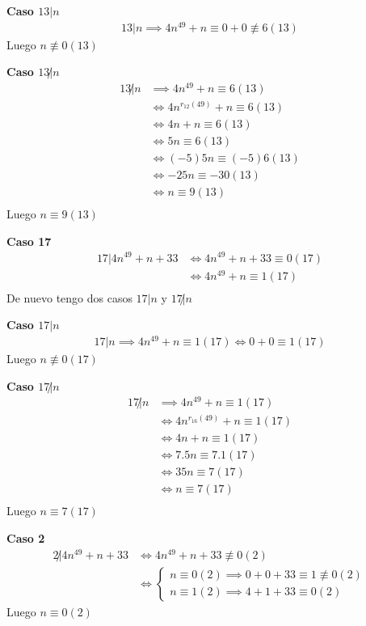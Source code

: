 \textbf{Caso $13|n$ }
\begin{align*}
    13 | n \implies 4n^{49} + n \equiv 0 + 0 \not \equiv 6 (13)
\end{align*}
Luego $ n \not \equiv 0(13) $

\textbf{Caso $13\not |n$ }
\begin{align*}
    13 \not | n &\implies 4n^{49} + n \equiv 6 (13) \\
    &\iff 4n^{r_{12}(49)} + n \equiv 6 (13) \\
    &\iff 4n + n \equiv 6 (13) \\
    &\iff 5n \equiv 6 (13) \\
    &\iff (-5)5n \equiv (-5)6 (13) \\
    &\iff -25n \equiv -30 (13) \\
    &\iff n \equiv 9 (13) \\
\end{align*}
Luego $ n \equiv 9(13) $

\textbf{Caso 17}
\begin{align*}
    17 | 4n^{49} + n + 33 &\iff 4n^{49} + n + 33 \equiv 0 (17) \\
    &\iff 4n^{49} + n \equiv 1 (17) \\
\end{align*}
De nuevo tengo dos casos $ 17|n$ y $17 \not | n $

\textbf{Caso $17|n$}
\begin{align*}
    17 | n \implies 4n^{49} + n \equiv 1 (17) \iff 0 + 0 \equiv 1 (17)
\end{align*}
Luego $ n \not \equiv 0 (17) $

\textbf{Caso $17\not |n$}
\begin{align*}
    17 \not | n &\implies 4n^{49} + n \equiv 1 (17) \\
    &\iff 4n^{r_{16}(49)} + n \equiv 1 (17) \\
    &\iff 4n + n \equiv 1 (17) \\
    &\iff 7.5n \equiv 7.1 (17) \\
    &\iff 35n \equiv 7 (17) \\
    &\iff n \equiv 7 (17) \\
\end{align*}
Luego $ n \equiv 7(17) $

\textbf{Caso 2}
\begin{align*}
    2 \not | 4n^{49} + n + 33 &\iff 4n^{49} + n + 33 \not \equiv 0 (2) \\
    &\iff \begin{cases}
        n \equiv 0 (2) \implies 0 + 0 + 33 \equiv 1 \not \equiv 0 (2) \\
        n \equiv 1 (2) \implies 4 + 1 + 33 \equiv 0 (2)
    \end{cases}
\end{align*}
Luego $ n \equiv 0 (2) $

